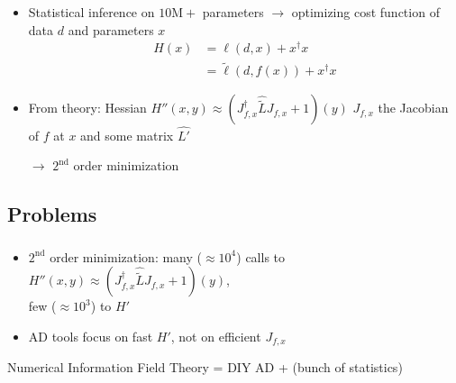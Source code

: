 \documentclass[aspectratio=169,xcolor=dvipsnames]{beamer}
\begin{document}
\begin{frame}
	\frametitle{\insertsection}
	\framesubtitle{\insertsubsection}

	\begin{itemize}
		\item Statistical inference on $10\mathrm{M}+$ parameters $\rightarrow$ optimizing cost function of data $d$ and parameters $x$
		\begin{align*}
			H(x) &= \ell(d, x) + x^\dagger x
			\\ &= \tilde{\ell}(d, f(x)) + x^\dagger x
		\end{align*}
		\item From theory: Hessian $H''(x, y) \approx (J_{f,x}^\dagger \widehat{\tilde{L}} J_{f,x} + 1)(y)$ {\tiny\color{gray}$J_{f,x}$ the Jacobian of $f$ at $x$ and some matrix $\hat{L'}$}
		\item[$\rightarrow$] $2^\text{nd}$ order minimization
	\end{itemize}

\end{frame}

\subsection{Problems}  %
\begin{frame}
	\frametitle{\insertsection}
	\framesubtitle{\insertsubsection}

	\begin{itemize}
		\item $2^\text{nd}$ order minimization: many ($\approx10^4$) calls to $H''(x, y) \approx (J_{f,x}^\dagger \widehat{\tilde{L}} J_{f,x} + 1)(y)$,
		\\ few ($\approx10^3$) to $H'$
		\item AD tools focus on fast $H'$, not on efficient $J_{f,x}$
	\end{itemize}

	\begin{center}
		Numerical Information Field Theory = DIY AD + (bunch of statistics)
	\end{center}

\end{frame}
\end{document}
